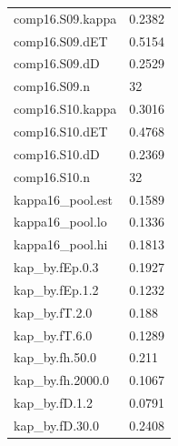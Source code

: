 {\begin{longtable}{p{}p{}}
{}comp16.S09.kappa & 0.2382\\
{}comp16.S09.dET & 0.5154\\
{}comp16.S09.dD & 0.2529\\
{}comp16.S09.n & 32\\
{}comp16.S10.kappa & 0.3016\\
{}comp16.S10.dET & 0.4768\\
{}comp16.S10.dD & 0.2369\\
{}comp16.S10.n & 32\\
{}kappa16\_pool.est & 0.1589\\
{}kappa16\_pool.lo & 0.1336\\
{}kappa16\_pool.hi & 0.1813\\
{}kap\_by.fEp.0.3 & 0.1927\\
{}kap\_by.fEp.1.2 & 0.1232\\
{}kap\_by.fT.2.0 & 0.188\\
{}kap\_by.fT.6.0 & 0.1289\\
{}kap\_by.fh.50.0 & 0.211\\
{}kap\_by.fh.2000.0 & 0.1067\\
{}kap\_by.fD.1.2 & 0.0791\\
{}kap\_by.fD.30.0 & 0.2408\\
\bottomrule\end{longtable}}

